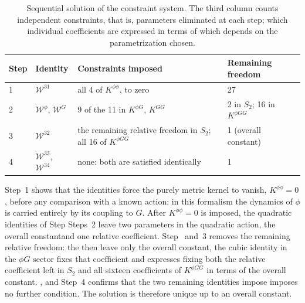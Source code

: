 \documentclass[prd,aps,preprint,superscriptaddress,nofootinbib,amsmath,amssymb,eqsecnum]{revtex4-2}
\newcommand{\W}{\mathcal{W}}
\providecommand{\DIFaddtex}[1]{{\protect\color{blue} \sf #1}} %
\providecommand{\DIFdeltex}[1]{{\protect\color{red} \scriptsize #1}} %
\providecommand{\DIFaddbegin}{} %
\providecommand{\DIFaddend}{} %
\providecommand{\DIFdelbegin}{} %
\providecommand{\DIFdelend}{} %
\providecommand{\DIFadd}[1]{\texorpdfstring{\DIFaddtex{#1}}{#1}} %
\providecommand{\DIFdel}[1]{\texorpdfstring{\DIFdeltex{#1}}{}} %
\begin{document}
\begin{table}[htb]
\centering
\begin{tabular}{@{}llll@{}}
\toprule
Step & Identity & Constraints imposed & Remaining freedom \\
\midrule
1 & $\W^{31}$ & all 4 of $K^{\phi\phi}$, to zero & 27 \\
2 & $\W^{\phi}$, $\W^{G}$ & 9 of the 11 in $K^{\phi G}$, $K^{GG}$ & 2 in $S_2$; 16 in $K^{\phi GG}$ \\
3 & $\W^{32}$ & the remaining relative freedom in $S_2$; all 16 of $K^{\phi GG}$ & 1 (overall constant) \\
4 & $\W^{33}$, $\W^{34}$ & none: both are satisfied identically & 1 \\
\bottomrule
\end{tabular}
\caption{Sequential solution of the constraint system. The third column counts
independent constraints, that is, parameters eliminated at each step; which individual
coefficients are expressed in terms of which depends on the parametrization chosen.}
\label{tab:flow}
\end{table}

Step~1 shows that the identities force the purely metric kernel to vanish,
$K^{\phi\phi}=0$, before any comparison with a known action: in this formalism the
dynamics of $\phi$ is carried entirely by its coupling to $G$. \DIFdelbegin \DIFdel{After $K^{\phi\phi}=0$ is
imposed, the quadratic identities of Step}\DIFdelend \DIFaddbegin \DIFadd{Steps}\DIFaddend ~2 \DIFdelbegin \DIFdel{leave two parameters in the quadratic action,
the overall constantand one relative coefficient. Step~}\DIFdelend \DIFaddbegin \DIFadd{and~}\DIFaddend 3 \DIFdelbegin \DIFdel{removes the remaining relative
freedom: the }\DIFdelend \DIFaddbegin \DIFadd{then leave only
the overall constant, the }\DIFaddend cubic identity in the $\phi G$ sector \DIFdelbegin \DIFdel{fixes that coefficient and expresses }\DIFdelend \DIFaddbegin \DIFadd{fixing both the relative
coefficient left in $S_2$ and }\DIFaddend all sixteen coefficients of $K^{\phi GG}$\DIFdelbegin \DIFdel{in terms of the overall constant. }\DIFdelend \DIFaddbegin \DIFadd{, and }\DIFaddend Step~4 \DIFdelbegin \DIFdel{confirms that
the two remaining identities impose }\DIFdelend \DIFaddbegin \DIFadd{imposes
}\DIFaddend no further condition. The solution is therefore unique up to an overall constant.
\end{document}
